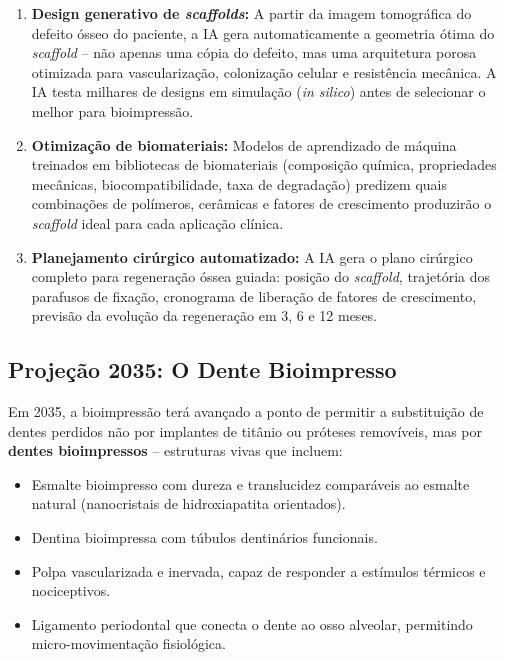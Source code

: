 \begin{enumerate}
  \item \textbf{Design generativo de \textit{scaffolds}:} A partir da imagem
    tomográfica do defeito ósseo do paciente, a IA gera automaticamente a
    geometria ótima do \textit{scaffold} -- não apenas uma cópia do defeito,
    mas uma arquitetura porosa otimizada para vascularização, colonização
    celular e resistência mecânica. A IA testa milhares de designs em
    simulação (\textit{in silico}) antes de selecionar o melhor para
    bioimpressão.

  \item \textbf{Otimização de biomateriais:} Modelos de aprendizado de máquina
    treinados em bibliotecas de biomateriais (composição química, propriedades
    mecânicas, biocompatibilidade, taxa de degradação) predizem quais
    combinações de polímeros, cerâmicas e fatores de crescimento produzirão o
    \textit{scaffold} ideal para cada aplicação clínica.

  \item \textbf{Planejamento cirúrgico automatizado:} A IA gera o plano
    cirúrgico completo para regeneração óssea guiada: posição do \textit{
    scaffold}, trajetória dos parafusos de fixação, cronograma de liberação de
    fatores de crescimento, previsão da evolução da regeneração em 3, 6 e 12
    meses.
\end{enumerate}


\subsection{Projeção 2035: O Dente Bioimpresso}

Em 2035, a bioimpressão terá avançado a ponto de permitir a substituição de
dentes perdidos não por implantes de titânio ou próteses removíveis, mas por
\textbf{dentes bioimpressos} -- estruturas vivas que incluem:

\begin{itemize}
  \item Esmalte bioimpresso com dureza e translucidez comparáveis ao esmalte
    natural (nanocristais de hidroxiapatita orientados).
  \item Dentina bioimpressa com túbulos dentinários funcionais.
  \item Polpa vascularizada e inervada, capaz de responder a estímulos térmicos
    e nociceptivos.
  \item Ligamento periodontal que conecta o dente ao osso alveolar, permitindo
    micro-movimentação fisiológica.
\end{itemize}


